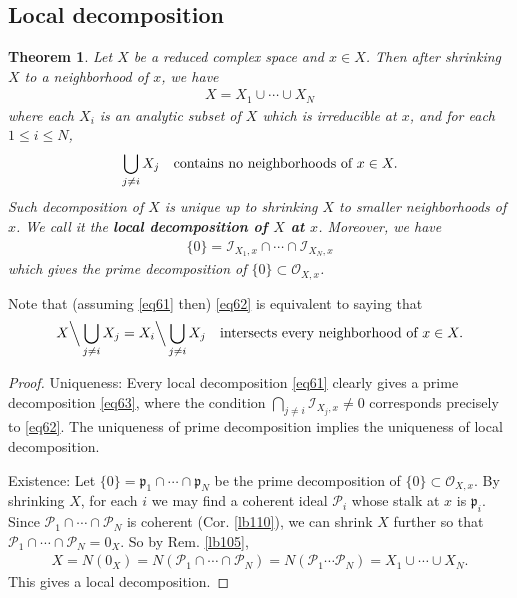 \documentclass[12pt,b5paper,notitlepage]{report}
\theoremstyle{definition}
\theoremstyle{plain}
\newtheorem{thm}[df]{Theorem}
\newcommand{\scr}{\mathscr}
\newcommand{\pk}{\mathfrak p}
\numberwithin{equation}{section}
\begin{document}
\subsection{Local decomposition}


\begin{thm}\label{lb124}
Let $X$ be a reduced complex space and $x\in X$. Then after shrinking $X$ to a neighborhood of $x$, we have
\begin{align}
X=X_1\cup\cdots\cup X_N  \label{eq61}
\end{align}
where each $X_i$ is an analytic subset of $X$ which is irreducible at $x$, and for each $1\leq i\leq N$,
\begin{align}
\bigcup_{j\neq i}X_j\quad\textnormal{contains no neighborhoods of }x\in X.\label{eq62}
\end{align}
Such decomposition of $X$ is unique up to shrinking $X$ to smaller neighborhoods of $x$. We call it the \textbf{local decomposition of $X$ at $x$}.  Moreover, we have
\begin{align}
\{0\}=\scr I_{X_1,x}\cap\cdots\cap\scr I_{X_N,x}  \label{eq63}
\end{align}
which gives the prime decomposition of $\{0\}\subset\scr O_{X,x}$.
\end{thm}

Note that (assuming \eqref{eq61} then) \eqref{eq62} is equivalent to saying that
\begin{align}\label{eq64}
X\Big\backslash \bigcup_{j\neq i}X_j=X_i\Big\backslash \bigcup_{j\neq i}X_j\quad\text{intersects every neighborhood of }x\in X.
\end{align}


\begin{proof}
Uniqueness: Every local decomposition \eqref{eq61} clearly gives a prime decomposition \eqref{eq63}, where the condition $\bigcap_{j\neq i}\scr I_{X_j,x}\neq 0$ corresponds precisely to \eqref{eq62}. The uniqueness of prime decomposition implies the uniqueness of local decomposition.

Existence: Let $\{0\}=\pk_1\cap\cdots\cap\pk_N$ be the prime decomposition of $\{0\}\subset\scr O_{X,x}$. By shrinking $X$, for each $i$ we may find a coherent ideal $\scr P_i$ whose stalk at $x$ is $\pk_i$. Since $\scr P_1\cap\cdots\cap\scr P_N$ is coherent (Cor. \ref{lb110}), we can shrink $X$ further so that $\scr P_1\cap\cdots\cap\scr P_N=0_X$. So by Rem. \ref{lb105},
\begin{align*}
X=N(0_X)=N(\scr P_1\cap\cdots\cap\scr P_N)=N(\scr P_1\cdots\scr P_N)=X_1\cup\cdots\cup X_N.
\end{align*}
This gives a local decomposition.
\end{proof}
\end{document}
